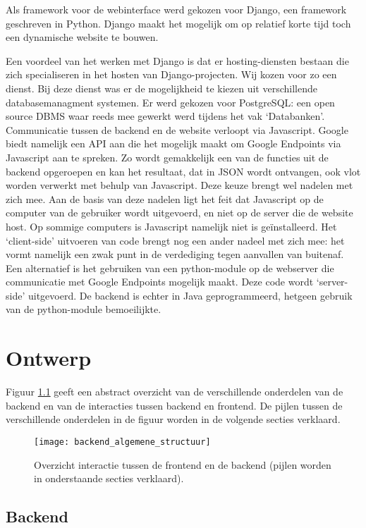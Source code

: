 Als framework voor de webinterface werd gekozen voor Django, een framework geschreven in Python. Django maakt het mogelijk om op relatief korte tijd toch een dynamische website te bouwen.

Een voordeel van het werken met Django is dat er hosting-diensten bestaan die zich specialiseren in het hosten van Django-projecten. Wij kozen voor zo een dienst\cite{djangoeurope}.
Bij deze dienst was er de mogelijkheid te kiezen uit verschillende databasemanagment systemen. Er werd gekozen voor PostgreSQL: een open source DBMS waar reeds mee gewerkt werd tijdens het vak `Databanken'.
Communicatie tussen de backend en de website verloopt via Javascript. Google biedt namelijk een API aan die het mogelijk maakt om Google Endpoints via Javascript aan te spreken. Zo wordt gemakkelijk een van de functies uit de backend opgeroepen en kan het resultaat, dat in JSON wordt ontvangen, ook vlot worden verwerkt met behulp van Javascript. Deze keuze brengt wel nadelen met zich mee. Aan de basis van deze nadelen ligt het feit dat Javascript op de computer van de gebruiker wordt uitgevoerd, en niet op de server die de website host. Op sommige computers is Javascript namelijk niet is geïnstalleerd. Het `client-side' uitvoeren van code brengt nog een ander nadeel met zich mee: het vormt namelijk een zwak punt in de verdediging tegen aanvallen van buitenaf. Een alternatief is het gebruiken van een python-module op de webserver die communicatie met Google Endpoints mogelijk maakt. Deze code wordt `server-side' uitgevoerd. De backend is echter in Java geprogrammeerd, hetgeen gebruik van de python-module bemoeilijkte.

\chapter{Ontwerp}
Figuur \ref{fig:algemene structuur backend} geeft een abstract overzicht van de verschillende onderdelen van de backend en van de interacties tussen backend en frontend. De pijlen tussen de verschillende onderdelen in de figuur worden in de volgende secties verklaard.

\begin{figure}[H]
	\centering
	\texttt{[image: backend\_algemene\_structuur]}
	\caption{Overzicht interactie tussen de frontend en de backend (pijlen worden in onderstaande secties verklaard).}
	\label{fig:algemene structuur backend}
	
\end{figure}
\section{Backend}
